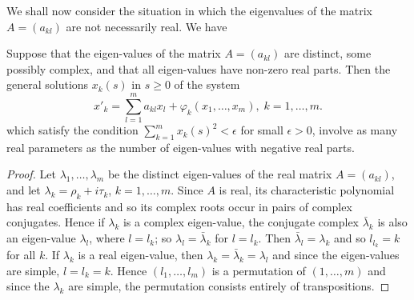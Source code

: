 We shall now consider the situation in which the eigenvalues of the
matrix $A = (a_{kl})$ are not necessarily real. We have 

\begin{subtheorem}\label{chap3:thm3.5.2}
Suppose that the eigen-values of the matrix $A = (a_{kl})$ are
distinct, some possibly complex, and that all eigen-values have
non-zero real parts. Then the general solutions $x_k(s)$ in $s \geq 0$
of the system 
$$
x'_k = \sum\limits^m_{l=1}  a_{kl} x_l +  \varphi_k  (x_1, \ldots, x_m), \; k =1 , \ldots, m. 
$$
which satisfy the condition $\sum\limits^m_{k=1} x_k(s)^2 < \epsilon$
for small $\epsilon > 0$, involve as many real parameters as the
number of eigen-values with negative real parts.  
\end{subtheorem}

\begin{proof}
Let $\lambda_1, \ldots,\lambda_m$ be the distinct eigen-values of the
real matrix $A = (a_{kl})$, and let $\lambda_k = \rho_k + i \tau_k$,
$k =1, \ldots, m$. Since $A$ is real, its characteristic polynomial
has real coefficients and so its complex roots occur in pairs of
complex conjugates. Hence if $\lambda_k$ is a complex eigen-value, the
conjugate complex $\bar{\lambda}_k$ is also an eigen-value
$\lambda_l$, where $l = l_k$; so $\lambda_l = \bar{\lambda}_k$ for $l
= l_k$. Then $\bar{\lambda}_l = \lambda_k$ and so $l_{l_k} = k$ for
all $k$. If $\lambda_k$ is a real eigen-value, then $\lambda_k =
\bar{\lambda}_k = \lambda_l$ and since the eigen-values are simple, $l
= l_k = k$. Hence $(l_1, \ldots, l_m)$ is a permutation of $(1,
\ldots, m)$ and since the $\lambda_k$ are simple, the permutation
consists entirely of transpositions. 
\end{proof}

